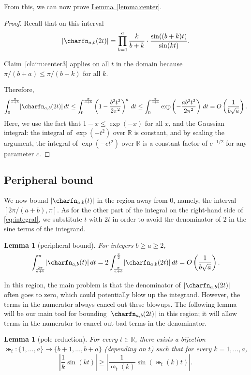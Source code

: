 \documentclass[11pt]{article}
\numberwithin{equation}{section}
\newtheorem{lemma}[theorem]{Lemma}
\theoremstyle{definition}
\theoremstyle{plain}
\newcommand{\expref}[2]{\hyperref[#2]{#1~\ref{#2}}}
\begin{document}
From this, we can now prove \expref{Lemma}{lemma:center}.

\begin{proof}
    Recall that on this interval
    \[\lvert\charfn_{a,b}(2t)\rvert=\prod_{k=1}^{a} \frac{k}{b+k}\cdot\frac{\sin((b+k)t)}{\sin(kt)}.\]
    
\expref{Claim}{claim:center3} applies on all $t$ in the domain because $\pi/(b+a)\le \pi/(b+k)$ for all $k$.
    
    Therefore,
    \[\int_0^{\frac{\pi}{a+b}} \lvert\charfn_{a,b}(2t)\rvert\,dt \le \int_0^{\frac{\pi}{a+b}} \left(1-\frac{b^2t^2}{2\pi^2}\right)^a\,dt \le \int_0^{\frac{\pi}{a+b}} \exp\left(-\frac{ab^2t^2}{2\pi^2}\right)\,dt =O\left(\frac{1}{b\sqrt{a}}\right). \]
    Here, we use the fact that $1-x\le \exp(-x)$ for all $x$, and the Gaussian integral: the integral of $\exp(-t^2)$ over $\mathbb{R}$ is constant, and by scaling the argument, the integral of $\exp(-ct^2)$ over $\mathbb{R}$ is a constant factor of $c^{-1/2}$ for any parameter $c$. 
\end{proof}

\subsection{Peripheral bound}
\label{sec:peripheral}

We now bound $\lvert\charfn_{a,b}(t)\rvert$ in the region away from $0$, namely, the interval $[2\pi/(a+b),\pi]$. As for the other part of the integral on the right-hand side of \eqref{eq:integral}, we substitute $t$ with $2t$ in order to avoid the denominator of $2$ in the sine terms of the integrand. 

\begin{lemma}[peripheral bound]
    \label{lemma:far}
    For integers $b\ge a\ge 2$,
    \[ \int_{\frac{2\pi}{a+b}}^\pi \lvert\charfn_{a,b}(t)\rvert\, dt =  2 \int_{\frac{\pi}{a+b}}^{\frac{\pi}{2}} \lvert\charfn_{a,b}(2t)\rvert\, dt = O\left(\frac{1}{b\sqrt{a}}\right). \]    
\end{lemma}

In this region, the main problem is that the denominator of $\lvert\charfn_{a,b}(2t)\rvert$ often goes to zero, which could potentially blow up the integrand. However, the terms in the numerator always cancel out these blowups. The following lemma will be our main tool for bounding $\lvert\charfn_{a,b}(2t)\rvert$ in this region; it will allow terms in the numerator to cancel out bad terms in the denominator.

\begin{lemma}[pole reduction]
    \label{lemma:bijection}
    For every $t\in\mathbb{R}$, there exists a bijection $\bij_t:\{1,\dots,a\}\to\{b+1,\dots,b+a\}$ (depending on $t$) such that for every $k=1,\dots,a$,
    \[\left|\frac{1}{k}\sin(kt)\right| \ge \left|\frac{1}{\bij_t(k)}\sin(\bij_t(k)t)\right|. \]
\end{lemma}
\end{document}
